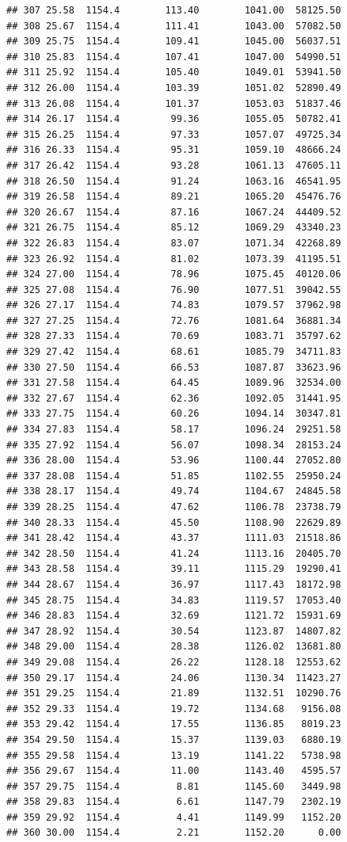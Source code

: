 \documentclass[]{article}
\begin{document}
\begin{verbatim}
## 307 25.58  1154.4        113.40        1041.00  58125.50
## 308 25.67  1154.4        111.41        1043.00  57082.50
## 309 25.75  1154.4        109.41        1045.00  56037.51
## 310 25.83  1154.4        107.41        1047.00  54990.51
## 311 25.92  1154.4        105.40        1049.01  53941.50
## 312 26.00  1154.4        103.39        1051.02  52890.49
## 313 26.08  1154.4        101.37        1053.03  51837.46
## 314 26.17  1154.4         99.36        1055.05  50782.41
## 315 26.25  1154.4         97.33        1057.07  49725.34
## 316 26.33  1154.4         95.31        1059.10  48666.24
## 317 26.42  1154.4         93.28        1061.13  47605.11
## 318 26.50  1154.4         91.24        1063.16  46541.95
## 319 26.58  1154.4         89.21        1065.20  45476.76
## 320 26.67  1154.4         87.16        1067.24  44409.52
## 321 26.75  1154.4         85.12        1069.29  43340.23
## 322 26.83  1154.4         83.07        1071.34  42268.89
## 323 26.92  1154.4         81.02        1073.39  41195.51
## 324 27.00  1154.4         78.96        1075.45  40120.06
## 325 27.08  1154.4         76.90        1077.51  39042.55
## 326 27.17  1154.4         74.83        1079.57  37962.98
## 327 27.25  1154.4         72.76        1081.64  36881.34
## 328 27.33  1154.4         70.69        1083.71  35797.62
## 329 27.42  1154.4         68.61        1085.79  34711.83
## 330 27.50  1154.4         66.53        1087.87  33623.96
## 331 27.58  1154.4         64.45        1089.96  32534.00
## 332 27.67  1154.4         62.36        1092.05  31441.95
## 333 27.75  1154.4         60.26        1094.14  30347.81
## 334 27.83  1154.4         58.17        1096.24  29251.58
## 335 27.92  1154.4         56.07        1098.34  28153.24
## 336 28.00  1154.4         53.96        1100.44  27052.80
## 337 28.08  1154.4         51.85        1102.55  25950.24
## 338 28.17  1154.4         49.74        1104.67  24845.58
## 339 28.25  1154.4         47.62        1106.78  23738.79
## 340 28.33  1154.4         45.50        1108.90  22629.89
## 341 28.42  1154.4         43.37        1111.03  21518.86
## 342 28.50  1154.4         41.24        1113.16  20405.70
## 343 28.58  1154.4         39.11        1115.29  19290.41
## 344 28.67  1154.4         36.97        1117.43  18172.98
## 345 28.75  1154.4         34.83        1119.57  17053.40
## 346 28.83  1154.4         32.69        1121.72  15931.69
## 347 28.92  1154.4         30.54        1123.87  14807.82
## 348 29.00  1154.4         28.38        1126.02  13681.80
## 349 29.08  1154.4         26.22        1128.18  12553.62
## 350 29.17  1154.4         24.06        1130.34  11423.27
## 351 29.25  1154.4         21.89        1132.51  10290.76
## 352 29.33  1154.4         19.72        1134.68   9156.08
## 353 29.42  1154.4         17.55        1136.85   8019.23
## 354 29.50  1154.4         15.37        1139.03   6880.19
## 355 29.58  1154.4         13.19        1141.22   5738.98
## 356 29.67  1154.4         11.00        1143.40   4595.57
## 357 29.75  1154.4          8.81        1145.60   3449.98
## 358 29.83  1154.4          6.61        1147.79   2302.19
## 359 29.92  1154.4          4.41        1149.99   1152.20
## 360 30.00  1154.4          2.21        1152.20      0.00
\end{verbatim}
\end{document}
